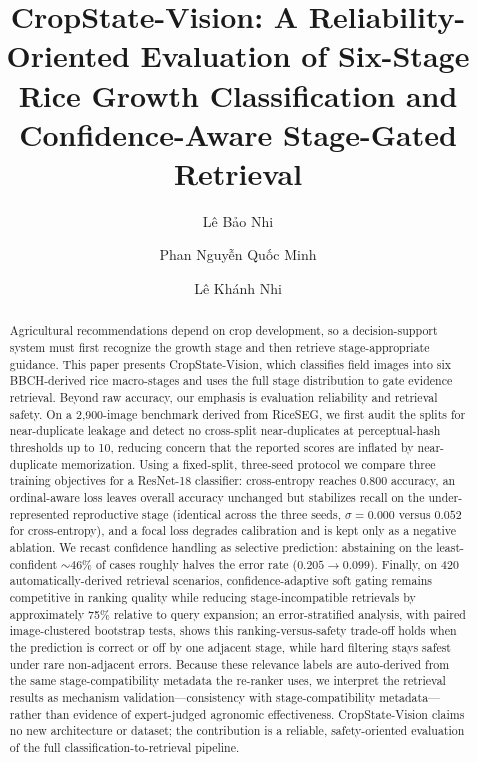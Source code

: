 \documentclass{llncs}
\begin{document}
\title{CropState-Vision: A Reliability-Oriented Evaluation of Six-Stage Rice Growth
Classification and Confidence-Aware Stage-Gated Retrieval}

\author{Lê Bảo Nhi \and Phan Nguyễn Quốc Minh \and Lê Khánh Nhi}


\maketitle

\begin{abstract}
Agricultural recommendations depend on crop development, so a decision-support system must first recognize the growth stage and then retrieve stage-appropriate guidance. This paper presents CropState-Vision, which classifies field images into six BBCH-derived rice macro-stages and uses the full stage distribution to gate evidence retrieval. Beyond raw accuracy, our emphasis is evaluation reliability and retrieval safety. On a 2{,}900-image benchmark derived from RiceSEG, we first audit the splits for near-duplicate leakage and detect no cross-split near-duplicates at perceptual-hash thresholds up to 10, reducing concern that the reported scores are inflated by near-duplicate memorization. Using a fixed-split, three-seed protocol we compare three training objectives for a ResNet-18 classifier: cross-entropy reaches 0.800 accuracy, an ordinal-aware loss leaves overall accuracy unchanged but stabilizes recall on the under-represented reproductive stage (identical across the three seeds, $\sigma=0.000$ versus $0.052$ for cross-entropy), and a focal loss degrades calibration and is kept only as a negative ablation. We recast confidence handling as selective prediction: abstaining on the least-confident ${\sim}46\%$ of cases roughly halves the error rate ($0.205\to0.099$). Finally, on 420 automatically-derived retrieval scenarios, confidence-adaptive soft gating remains competitive in ranking quality while reducing stage-incompatible retrievals by approximately 75\% relative to query expansion; an error-stratified analysis, with paired image-clustered bootstrap tests, shows this ranking-versus-safety trade-off holds when the prediction is correct or off by one adjacent stage, while hard filtering stays safest under rare non-adjacent errors. Because these relevance labels are auto-derived from the same stage-compatibility metadata the re-ranker uses, we interpret the retrieval results as mechanism validation---consistency with stage-compatibility metadata---rather than evidence of expert-judged agronomic effectiveness. CropState-Vision claims no new architecture or dataset; the contribution is a reliable, safety-oriented evaluation of the full classification-to-retrieval pipeline.

\end{abstract}
\end{document}
